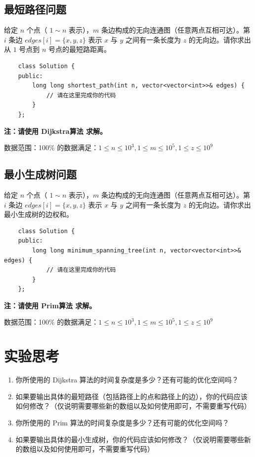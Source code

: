 \documentclass[12pt,a4paper]{article}
\begin{document}
\subsection{最短路径问题}
给定 $n$ 个点（ $1\sim n$ 表示），$m$ 条边构成的无向连通图（任意两点互相可达）。第 $i$ 条边 $edges[i] = \{x, y, z\}$ 表示 $x$ 与 $y$ 之间有一条长度为 $z$ 的无向边。请你求出从 $1$ 号点到 $n$ 号点的最短路距离。


\begin{lstlisting}
    class Solution {
    public:
        long long shortest_path(int n, vector<vector<int>>& edges) {
            // 请在这里完成你的代码
        }
    };
\end{lstlisting}

\textbf{注：请使用 Dijkstra算法 求解。}

数据范围：100\% 的数据满足：$1\le n \le 10^3, 1 \le m \le 10^5, 1 \le z \le 10^9$



\subsection{最小生成树问题}
给定 $n$ 个点（ $1\sim n$ 表示），$m$ 条边构成的无向连通图（任意两点互相可达）。第 $i$ 条边 $edges[i] = \{x, y, z\}$ 表示 $x$ 与 $y$ 之间有一条长度为 $z$ 的无向边。请你求出最小生成树的边权和。

\begin{lstlisting}
    class Solution {
    public:
        long long minimum_spanning_tree(int n, vector<vector<int>>& edges) {
            // 请在这里完成你的代码
        }
    };
\end{lstlisting}

\textbf{注：请使用 Prim算法 求解。}

数据范围：100\% 的数据满足：$1\le n \le 10^3, 1 \le m \le 10^5, 1 \le z \le 10^9$




\section{实验思考}

\begin{enumerate}
    \item 你所使用的 Dijkstra 算法的时间复杂度是多少？还有可能的优化空间吗？
    \item 如果要输出具体的最短路径（包括路径上的点和路径上的边），你的代码应该如何修改？（仅说明需要哪些新的数组以及如何使用即可，不需要重写代码）
    \item 你所使用的 Prim 算法的时间复杂度是多少？还有可能的优化空间吗？
    \item 如果要输出具体的最小生成树，你的代码应该如何修改？（仅说明需要哪些新的数组以及如何使用即可，不需要重写代码）
    
\end{enumerate}
\end{document}
